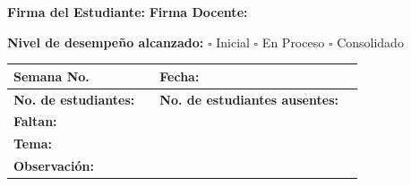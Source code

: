\documentclass[11pt]{article}
\begin{document}
\vspace{4mm}
\noindent\textbf{Firma del Estudiante:} \hrulefill \hspace{1cm}
\textbf{Firma Docente:} \hrulefill


\noindent\textbf{Nivel de desempeño alcanzado:}\quad
$\square$ Inicial \quad $\square$ En Proceso \quad $\square$ Consolidado

\vspace{2mm}



\noindent\begin{tabularx}{\linewidth}{|X|X|l|X|}
\hline
\textbf{Semana No.} & & \textbf{Fecha:} & \\
\hline
\textbf{No. de estudiantes:} & & \textbf{No. de estudiantes ausentes:} & \\
\hline
\multicolumn{4}{|l|}{\textbf{Faltan:}\vphantom{Ay}} \\
\hline
\multicolumn{4}{|l|}{\textbf{Tema:}\vphantom{Ay}} \\
\hline
\multicolumn{4}{|l|}{\textbf{Observación:}\vphantom{Ay}} \\
\hline
\end{tabularx}
\end{document}
